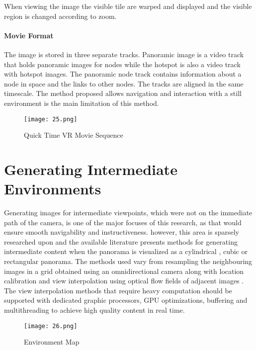When viewing the image the visible tile are warped and displayed and the visible region is changed according to zoom.

\paragraph*{\textbf{Movie Format}}
The image is stored in three separate tracks. 
Panoramic image is a video track that holds panoramic images for nodes while the hotspot is also a video track with hotspot images.
The panoramic node track contains information about a node in space and the links to other nodes. The tracks are aligned in the same timescale.
The method proposed allows navigation and interaction with a still environment is the main limitation of this method.

\begin{figure}[htbp]
\sidecaption
\texttt{[image: 25.png]}
\caption{Quick Time VR Movie Sequence}
\label{Fig_25_mov_seq}       %
\end{figure}

\section{Generating Intermediate Environments}

Generating images for intermediate viewpoints, which were not on the immediate path of the camera, is one of the major focuses of this research, as that would ensure smooth navigability and instructiveness. however, this area is sparsely researched upon and the available literature presents methods for generating intermediate content when the panorama is visualized as a cylindrical \cite{Aliaga2001} \cite{Aliaga01}, cubic \cite{Kolhatkar2010} or rectangular panorama. The methods used vary from resampling the neighbouring images in a grid obtained using an omnidirectional camera along with location calibration \cite{Aliaga2001} and view interpolation using optical flow fields of adjacent images \cite{Kolhatkar2010}. The view interpolation methods that require heavy computation should be supported with dedicated graphic processors, GPU optimizations, buffering and multithreading to achieve high quality content in real time. 

\begin{figure}[htbp]
\sidecaption
\texttt{[image: 26.png]}
\caption{Environment Map}
\label{Fig_26_env_map}       %
\end{figure}

